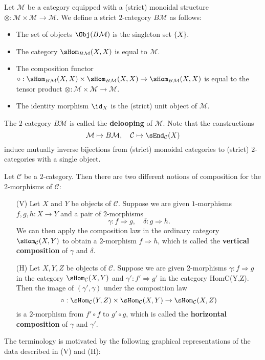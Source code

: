\begin{example}\label{2-cat delooping of monoidal cat}
Let $\mathcal{M}$ be a category equipped with a (strict) monoidal structure $\otimes:\mathcal{M}\times\mathcal{M}\to\mathcal{M}$. We define a strict $2$-category $B\mathcal{M}$ as follows:
\begin{itemize}
\item The set of objects $\Obj(B\mathcal{M})$ is the singleton set $\{X\}$.
\item The category $\sHom_{B\mathcal{M}}(X,X)$ is equal to $\mathcal{M}$.
\item The composition functor $\circ:\sHom_{B\mathcal{M}}(X,X)\times\sHom_{B\mathcal{M}}(X,X)\to\sHom_{B\mathcal{M}}(X,X)$ is equal to the tensor product $\otimes:\mathcal{M}\times\mathcal{M}\to\mathcal{M}$.
\item The identity morphism $\id_X$ is the (strict) unit object of $\mathcal{M}$.
\end{itemize}
The $2$-category $B\mathcal{M}$ is called the \textbf{delooping} of $\mathcal{M}$. Note that the constructions
\[\mathcal{M}\mapsto B\mathcal{M},\quad \mathcal{C}\mapsto\sEnd_{\mathcal{C}}(X)\]
induce mutually inverse bijections from (strict) monoidal categories to (strict) $2$-categories with a single object.
\end{example}
Let $\mathcal{C}$ be a $2$-category. Then there are two different notions of composition for the $2$-morphisms of $\mathcal{C}$:
\begin{itemize}
\item[(V)] Let $X$ and $Y$ be objects of $\mathcal{C}$. Suppose we are given $1$-morphisms $f,g,h:X\to Y$ and a pair of $2$-morphisms
\[\gamma:f\Rightarrow g,\quad \delta:g\Rightarrow h.\]
We can then apply the composition law in the ordinary category $\sHom_{\mathcal{C}}(X,Y)$ to obtain a $2$-morphism $f\Rightarrow h$, which is called the \textbf{vertical composition} of $\gamma$ and $\delta$.
\item[(H)] Let $X,Y,Z$ be objects of $\mathcal{C}$. Suppose we are given 2-morphisms $\gamma:f\Rightarrow g$ in the category $\sHom_{\mathcal{C}}(X,Y)$ and $\gamma':f'\Rightarrow g'$ in the category HomC(Y,Z). Then the image of $(\gamma',\gamma)$ under the composition law
\[\circ:\sHom_{\mathcal{C}}(Y,Z)\times\sHom_{\mathcal{C}}(X,Y)\to\sHom_{\mathcal{C}}(X,Z)\]
is a $2$-morphism from $f'\circ f$ to $g'\circ g$, which is called the \textbf{horizontal composition} of $\gamma$ and $\gamma'$.
\end{itemize}
The terminology is motivated by the following graphical representations of the data described in (V) and (H):
